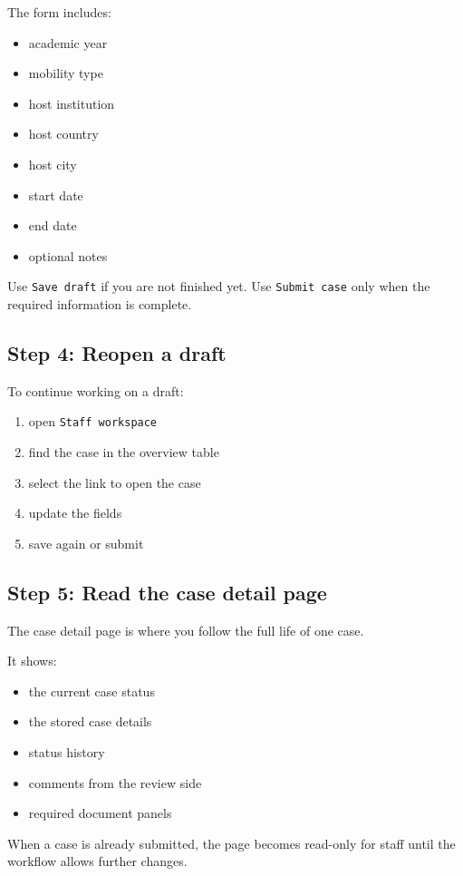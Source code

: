 \documentclass[11pt,a4paper]{article}
\begin{document}
The form includes:

\begin{itemize}
  \item academic year
  \item mobility type
  \item host institution
  \item host country
  \item host city
  \item start date
  \item end date
  \item optional notes
\end{itemize}

Use \texttt{Save draft} if you are not finished yet. Use \texttt{Submit case} only when the required information is complete.

\subsection*{Step 4: Reopen a draft}
To continue working on a draft:

\begin{enumerate}
  \item open \texttt{Staff workspace}
  \item find the case in the overview table
  \item select the link to open the case
  \item update the fields
  \item save again or submit
\end{enumerate}

\subsection*{Step 5: Read the case detail page}
The case detail page is where you follow the full life of one case.

It shows:

\begin{itemize}
  \item the current case status
  \item the stored case details
  \item status history
  \item comments from the review side
  \item required document panels
\end{itemize}

When a case is already submitted, the page becomes read-only for staff until the workflow allows further changes.
\end{document}
